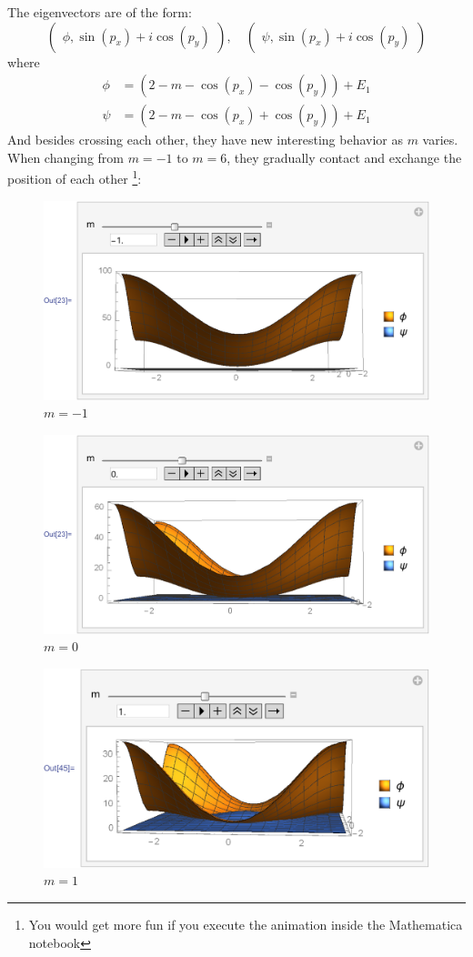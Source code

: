 \documentclass{article}
\begin{document}
The eigenvectors are of the form:
\begin{equation}
    \begin{pmatrix}
        \phi, \sin(p_x)+i\cos(p_y)
    \end{pmatrix},\quad \begin{pmatrix}
        \psi, \sin(p_x)+i\cos(p_y)
    \end{pmatrix}
\end{equation}
where
\begin{align}
    \phi &=  (2-m-\cos(p_x)-\cos(p_y))+E_1 \\
    \psi &=  (2-m-\cos(p_x)+\cos(p_y))+E_1
\end{align}
And besides crossing each other, they have new interesting behavior as
$m$ varies. When changing from $m=-1$ to $m=6$, they gradually contact
and exchange the position of each other
\footnote{You would get more fun if you execute the animation inside
the Mathematica notebook}:
\begin{figure}[H]
    \centering
    \includegraphics[width=0.6\linewidth]{pics/OpenBC-inXY/Eigen-mN1.pdf}
    \caption{$m=-1$}
\end{figure}
\begin{figure}[H]
    \centering
    \includegraphics[width=0.6\linewidth]{pics/OpenBC-inXY/Eigen-m0.pdf}
    \caption{$m=0$}
\end{figure}
\begin{figure}[H]
    \centering
    \includegraphics[width=0.6\linewidth]{pics/OpenBC-inXY/Eigen-m1.pdf}
    \caption{$m=1$}
\end{figure}
\end{document}
